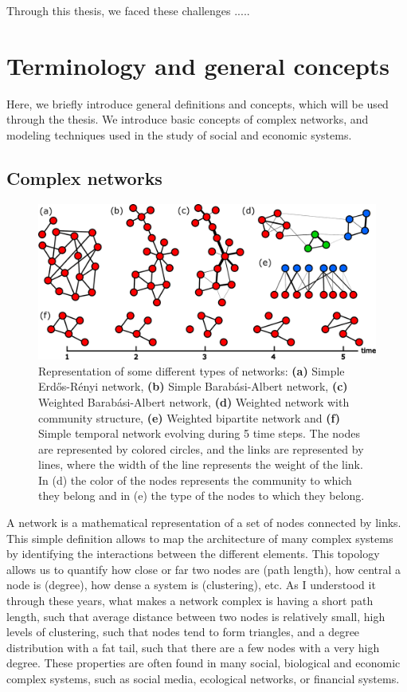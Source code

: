 Through this thesis, we faced these challenges .....

\section{\label{sec:Terminology and general concepts} Terminology and general concepts}

Here, we briefly introduce general definitions and concepts, which will be used through the thesis. We introduce basic concepts of complex networks, and modeling techniques used in the study of social and economic systems.
\subsection{\label{subsec:Complex networks} Complex networks}

\begin{figure}
    \centering
    \includegraphics[width=\textwidth]{Figs/Introduction/network_plot.pdf}
    \caption[Different network types]{Representation of some different types of networks: \textbf{(a)} Simple Erd\H{o}s-R\'enyi network, \textbf{(b)} Simple Barab\'asi-Albert network, \textbf{(c)} Weighted Barab\'asi-Albert network, \textbf{(d)} Weighted network with community structure, \textbf{(e)} Weighted bipartite network and \textbf{(f)} Simple temporal network evolving during 5 time steps. The nodes are represented by colored circles, and the links are represented by lines, where the width of the line represents the weight of the link. In (d) the color of the nodes represents the community to which they belong and in (e) the type of the nodes to which they belong.}
    \label{fig:netwotk_types}
\end{figure}

A network is a mathematical representation of a set of nodes connected by links. This simple definition allows to map the architecture of many complex systems by identifying the interactions between the different elements. This topology allows us to quantify how close or far two nodes are (path length), how central a node is (degree), how dense a system is (clustering), etc. As I understood it through these years, what makes a network complex is having a short path length, such that average distance between two nodes is relatively small, high levels of clustering, such that nodes tend to form triangles, and a degree distribution with a fat tail, such that there are a few nodes with a very high degree. These properties are often found in many social, biological and economic complex systems, such as social media, ecological networks, or financial systems.

